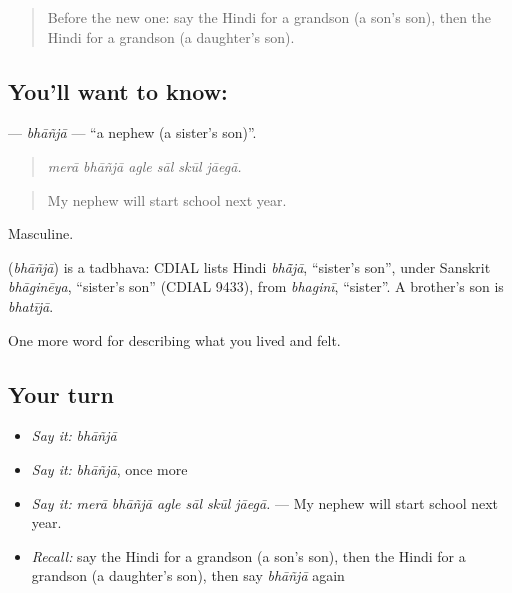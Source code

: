 \label{lesson:HI-C502-bhanja}



\begin{quote}
Before the new one: say the Hindi for a grandson (a son's son), then the Hindi for a grandson (a daughter's son).
\end{quote}

\subsection*{You'll want to know: }
\textbf{} — \emph{bhāñjā} — \textquotedblleft{}a nephew (a sister's son)\textquotedblright{}.

\begin{quote}
     
\end{quote}

\begin{quote}
\emph{merā bhāñjā agle sāl skūl jāegā.}
\end{quote}

\begin{quote}
My nephew will start school next year.
\end{quote}

Masculine.

\begin{cousinweb}
\textbf{} (\emph{bhāñjā}) is a tadbhava: CDIAL lists Hindi \emph{bhā̃jā}, \textquotedblleft{}sister's son\textquotedblright{}, under Sanskrit \emph{bhāginēya}, \textquotedblleft{}sister's son\textquotedblright{} (CDIAL 9433), from \emph{bhaginī}, \textquotedblleft{}sister\textquotedblright{}. A brother's son is \emph{bhatījā}.
\end{cousinweb}

\begin{grammarlens}[title={What you've built}]
One more word for describing what you lived and felt.
\end{grammarlens}

\subsection*{Your turn}
\begin{itemize}
\raggedright
  \item \emph{Say it:} \emph{bhāñjā}
  \item \emph{Say it:} \emph{bhāñjā}, once more
  \item \emph{Say it:} \emph{merā bhāñjā agle sāl skūl jāegā.} — My nephew will start school next year.
  \item \emph{Recall:} say the Hindi for a grandson (a son's son), then the Hindi for a grandson (a daughter's son), then say \emph{bhāñjā} again
\end{itemize}

